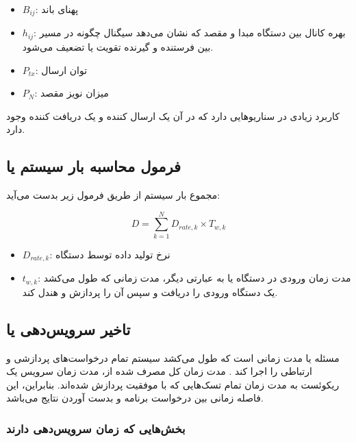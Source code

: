 \documentclass[a4paper]{article}
\begin{document}
\begin{itemize}
    \item $B_{ij}$: پهنای باند
    \item $h_{ij}$: بهره کانال بین دستگاه مبدا و مقصد که نشان می‌دهد سیگنال
    چگونه در مسیر بین فرستنده و گیرنده تقویت یا تضعیف می‌شود.
    \item $P_{tx}$: توان ارسال
    \item $P_{N}$: میزان نویز مقصد
\end{itemize}

کاربرد زیادی در سناریو‌هایی دارد که در آن یک ارسال کننده و یک دریافت کننده وجود
دارد.

\subsection{فرمول محاسبه بار سیستم یا }

مجموع بار سیستم از طریق فرمول زیر بدست می‌آید:

\begin{equation}
    D = \sum_{k = 1}^{N} D_{rate, k} \times T_{w, k}
\end{equation}

\begin{itemize}
    \item $D_{rate, k}$: نرخ تولید داده توسط دستگاه 
    \item $t_{w, k}$: مدت زمان ورودی در دستگاه  یا به عبارتی دیگر، مدت
    زمانی که طول می‌کشد یک دستگاه  ورودی را دریافت و سپس آن را پردازش و
    هندل کند.
\end{itemize}

\subsection{تاخیر سرویس‌دهی یا }

مسئله  یا  مدت زمانی
است که طول می‌کشد سیستم  تمام درخواست‌های پردازشی و ارتباطی را اجرا کند
. مدت زمان کل مصرف شده از، مدت زمان سرویس
یک ریکوئست به مدت زمان تمام تسک‌هایی که با موفقیت پردازش شده‌اند. بنابراین، این
فاصله زمانی بین درخواست برنامه و بدست آوردن نتایج می‌باشد.

\subsubsection{بخش‌هایی که زمان سرویس‌دهی دارند}
\end{document}
